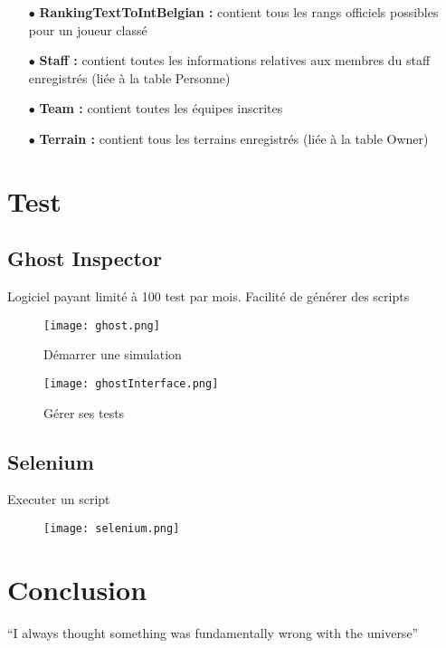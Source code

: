 \documentclass{article}
\begin{document}
\begin{itemize}
\item[$\bullet$]{\textbf{RankingTextToIntBelgian :}} contient tous les rangs officiels possibles pour un joueur classé

\item[$\bullet$]{\textbf{Staff  :}}  contient  toutes  les  informations  relatives  aux  membres  du  staff  enregistrés (liée à la table Personne)

\item[$\bullet$]{\textbf{Team :}} contient toutes les équipes inscrites

\item[$\bullet$]{\textbf{Terrain :}} contient tous les terrains enregistrés (liée à la table Owner)
\end{itemize}


\section{Test}
\subsection{Ghost Inspector}

Logiciel payant limité à 100 test par mois. Facilité de générer des scripts\\
\begin{figure}[h!]
\centering
\texttt{[image: ghost.png]}
\caption{Démarrer une simulation}
\end{figure}

\begin{figure}[h!]
\centering
\texttt{[image: ghostInterface.png]}
\caption{Gérer ses tests}
\end{figure}

\subsection{Selenium}

Executer un script\\
\begin{figure}[h!]
\centering
\texttt{[image: selenium.png]}
\caption{}
\end{figure}

\section{Conclusion}
``I always thought something was fundamentally wrong with the universe'' \citep{adams1995hitchhiker}



\end{document}
